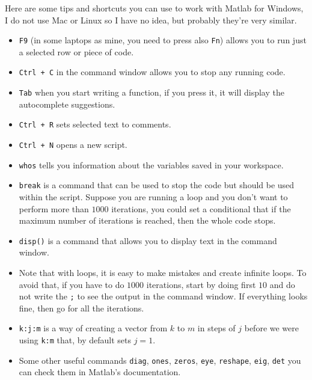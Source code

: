 \documentclass[a4paper,11pt]{article}
\begin{document}
Here are some tips and shortcuts you can use to work with Matlab for Windows, I do not use Mac or Linux so I have no idea, but probably they're very similar.

\begin{itemize}
	\item \verb;F9; (in some laptops as mine, you need to press also \verb;Fn;) allows you to run just a selected row or piece of code.
	\item \verb;Ctrl + C; in the command window allows you to stop any running code.
	\item \verb;Tab; when you start writing a function, if you press it, it will display the autocomplete suggestions.
	\item \verb;Ctrl + R; sets selected text to comments.
	\item \verb;Ctrl + N; opens a new script.
	\item \verb;whos; tells you information about the variables saved in your workspace.
	\item \verb;break; is a command that can be used to stop the code but should be used within the script. Suppose you are running a loop and you don't want to perform more than $1000$ iterations, you could set a conditional that if the maximum number of iterations is reached, then the whole code stops.
	\item \verb;disp(); is a command that allows you to display text in the command window.
	\item Note that with loops, it is easy to make mistakes and create infinite loops. To avoid that, if you have to do $1000$ iterations, start by doing first $10$ and do not write the \verb+;+ to see the output in the command window. If everything looks fine, then go for all the iterations.
	\item \verb;k:j:m; is a way of creating a vector from $k$ to $m$ in steps of $j$ before we were using \verb;k:m; that, by default sets $j=1$.
	\item Some other useful commands \verb;diag;, \verb;ones;, \verb;zeros;, \verb;eye;, \verb;reshape;, \verb;eig;, \verb;det; you can check them in Matlab's documentation.
\end{itemize}
\end{document}
